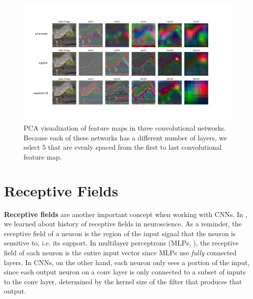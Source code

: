 \begin{figure}[h]
    \centerline{
        \includegraphics[width=1.0\linewidth]{figures/convolutional_neural_nets/feature_maps_pca_viz.pdf}
    }
    \caption{PCA visualization of feature maps in three convolutional networks. Because each of these networks has a different number of layers, we select 5 that are evenly spaced from the first to last convolutional feature map.}
    \label{fig:convolutional_neural_nets:feature_maps_pca_viz}
\end{figure}


\section{Receptive Fields}\label{sec:convolutional_neural_nets:receptive_fields}

\textbf{Receptive fields} are another important concept when working with CNNs. In \chap{\ref{chap:challenge_of_vision}}, we learned about history of receptive fields in neuroscience. As a reminder, the receptive field of a neuron is the region of the input signal that the neuron is sensitive to, i.e. its support. In multilayer perceptrons (MLPs, \chap{\ref{chapter:neural_nets}}), the receptive field of each neuron is the entire input vector since MLPs use \textit{fully} connected layers. In CNNs, on the other hand, each neuron only sees a portion of the input, since each output neuron on a conv layer is only connected to a subset of inputs to the conv layer, determined by the kernel size of the filter that produces that output.

